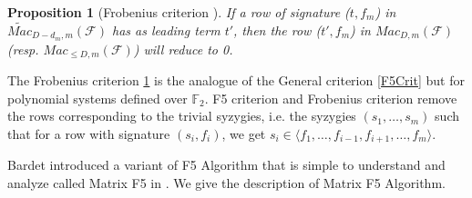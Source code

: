 \documentclass[english]{article}
\newtheorem{proposition}{Proposition}[section]
\newcommand{\Mac}[3]{{Mac_{#1, #2}(\mathcal{#3})}}
\newcommand{\Mact}[3]{{\widetilde{Mac}_{#1, #2}(\mathcal{#3})}}
\begin{document}
		\begin{proposition}[Frobenius criterion \cite{F02}]
			\label{Frob}
			If a row of signature ($t, f_m$) in $\Mact{D - d_m}{m}{F}$ has as leading term $t'$, then the row ($t', f_m$) in $\Mac{D}{m}{F}$ (resp. $\Mac{\leq D}{m}{F}$) will reduce to 0.
		\end{proposition}
		
		The Frobenius criterion \ref{Frob} is the analogue of the General criterion \ref{F5Crit} but for polynomial systems defined over $\mathbb{F}_2$.
		F5 criterion and Frobenius criterion remove the rows corresponding to the trivial syzygies, i.e. the syzygies $(s_1, \dots, s_m)$ such that for a row with signature $(s_i, f_i)$, we get $s_i \in \langle f_1,\dots,f_{i-1},f_{i+1},\dots,f_m \rangle$.
		
		Bardet introduced a variant of F5 Algorithm that is simple to understand and analyze called Matrix F5 in \cite{Bardet04}.
		We give the description of Matrix F5 Algorithm.
		
\end{document}
